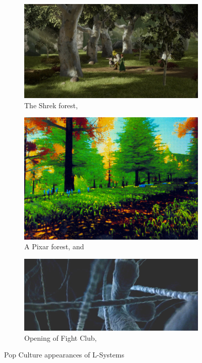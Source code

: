 \documentclass[12pt,twoside]{reedthesis}
\begin{document}
	\begin{figure}[H]
	\centering
	\begin{subfigure}{0.6\linewidth}
		\centering
		\includegraphics[width=\linewidth]{Images/ShrekImage}
		\caption{The Shrek forest, \cite{shrek2001}}
		\label{ShrekImage}
	\end{subfigure}
	\begin{subfigure}{0.37\linewidth}
		\centering
		\includegraphics[width=\linewidth]{Images/PixarImage}
		\caption{A Pixar forest, \cite{pixar1985} and \cite{ABOP1990}}
		\label{PixarImage}
	\end{subfigure}
	\begin{subfigure}{0.8\linewidth}
		\centering
		\includegraphics[width=\linewidth]{Images/FightClubImage}
		\caption{Opening of Fight Club, \cite{FightClub1999}}
		\label{FightClubImage}
	\end{subfigure}
	\caption{Pop Culture appearances of L-Systems}
	\label{PopCulture}
	\end{figure}
\end{document}
